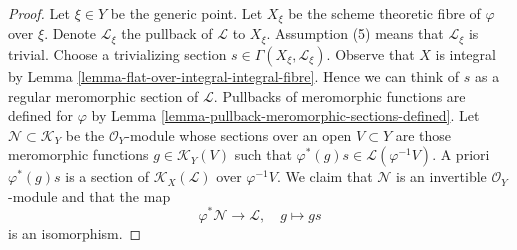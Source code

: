 \begin{proof}
Let $\xi \in Y$ be the generic point. Let $X_\xi$ be the scheme theoretic
fibre of $\varphi$ over $\xi$. Denote $\mathcal{L}_\xi$ the pullback of
$\mathcal{L}$ to $X_\xi$. Assumption (5) means that $\mathcal{L}_\xi$
is trivial. Choose a trivializing section
$s \in \Gamma(X_\xi, \mathcal{L}_\xi)$. Observe that $X$ is integral by
Lemma \ref{lemma-flat-over-integral-integral-fibre}.
Hence we can think of $s$ as a regular meromorphic section of $\mathcal{L}$.
Pullbacks of meromorphic functions are defined for
$\varphi$ by Lemma \ref{lemma-pullback-meromorphic-sections-defined}.
Let $\mathcal{N} \subset \mathcal{K}_Y$ be the $\mathcal{O}_Y$-module
whose sections over an open $V \subset Y$ are those meromorphic functions
$g \in \mathcal{K}_Y(V)$ such that
$\varphi^*(g)s \in \mathcal{L}(\varphi^{-1}V)$.
A priori $\varphi^*(g)s$ is a section of $\mathcal{K}_X(\mathcal{L})$ over
$\varphi^{-1}V$. We claim that $\mathcal{N}$ is an invertible
$\mathcal{O}_Y$-module and that the map
$$
\varphi^*\mathcal{N} \longrightarrow \mathcal{L},\quad
g \longmapsto gs
$$
is an isomorphism.


\end{proof}
